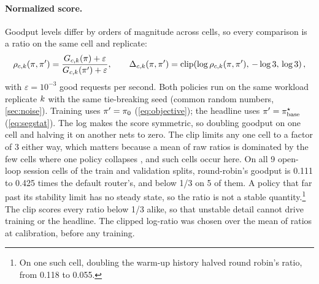 \paragraph{Normalized score.}
Goodput levels differ by orders of magnitude across cells, so every comparison is a ratio on the
same cell and replicate:
\begin{equation}
  \label{eq:clr}
  \rho_{c,k}(\pi,\pi') = \frac{G_{c,k}(\pi)+\varepsilon}{G_{c,k}(\pi')+\varepsilon},
  \qquad
  \Delta_{c,k}(\pi,\pi') = \operatorname{clip}\!\left(\log \rho_{c,k}(\pi,\pi'),\,-\log 3,\,\log 3\right),
\end{equation}
with $\varepsilon = 10^{-3}$ good requests per second. Both policies run on the same workload
replicate $k$ with the same tie-breaking seed (common random numbers, \cref{sec:noise}).
Training uses $\pi' = \pi_{0}$ (\cref{eq:objective}); the headline uses $\pi' = \pi^{\star}_{\mathrm{base}}$
(\cref{eq:segstat}). The log makes the score symmetric, so doubling goodput on one cell and halving
it on another nets to zero. The clip limits any one cell to a factor of 3 either way, which matters
because a mean of raw ratios is dominated by the few cells where one policy collapses
\citep{agarwal2021precipice}, and such cells occur here. On all 9 open-loop session cells of the
train and validation splits, round-robin's goodput is 0.111 to 0.425 times the default router's,
and below 1/3 on 5 of them. A policy that far past its stability limit has no steady state, so the
ratio is not a stable quantity.\footnote{On one such cell, doubling the warm-up history halved round
  robin's ratio, from 0.118 to 0.055.}
The clip scores every ratio below 1/3 alike, so that unstable detail cannot drive training
or the headline.
The clipped log-ratio was chosen over the mean of ratios at calibration, before any training.

